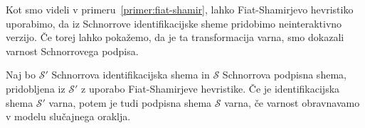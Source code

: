 Kot smo videli v primeru~\ref{primer:fiat-shamir}, lahko Fiat-Shamirjevo hevristiko uporabimo, da
iz Schnorrove identifikacijske sheme pridobimo neinteraktivno verzijo. Če torej lahko pokažemo,
da je ta transformacija varna, smo dokazali varnost Schnorrovega podpisa.

\begin{izrek}
\label{izrek:fiat-shamir-sec}
    Naj bo $\mathcal{S'}$ Schnorrova identifikacijska shema in $\mathcal{S}$ Schnorrova podpisna
    shema, pridobljena iz $\mathcal{S'}$ z uporabo Fiat-Shamirjeve hevristike. Če je identifikacijska
    shema $\mathcal{S'}$ varna, potem je tudi podpisna shema $\mathcal{S}$ varna, če varnost
    obravnavamo v modelu slučajnega oraklja.
\end{izrek}

